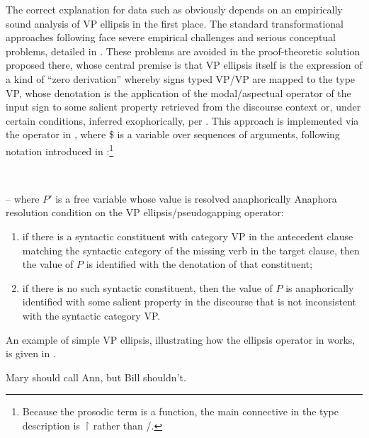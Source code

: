 \documentclass[output=paper,colorlinks,citecolor=brown]{langscibook}
\begin{document}
The correct explanation for data such as  obviously
depends on an empirically sound analysis of VP ellipsis in the first
place. The standard transformational approaches following \citet{kuno1981}
face severe empirical challenges and serious conceptual problems,
detailed in \citet{kubota-levine-pseudo}. These problems are avoided in the
proof-theoretic solution proposed there, whose central premise is that VP
ellipsis itself is the expression of a kind of ``zero derivation''
whereby signs typed VP/VP are mapped to the type VP, whose denotation
is the application of the modal/aspectual operator of the input sign
to some salient property retrieved from the discourse context or,
under certain conditions, inferred exophorically, per
\citet{MillerPullum13}. This approach is implemented via the operator in
, where \$ is a variable over sequences of arguments,
following notation introduced in :\footnote{Because the
prosodic term is a function, the main connective in the type
description is \ensuremath{\vs} rather than /.}

\begin{exe}
 \ex\label{ellipseOp1}
   \\

   -- where $P'$ is a free variable whose value is
  resolved anaphorically
 \ex
  Anaphora resolution condition on the VP ellipsis/pseudogapping
  operator:
  \begin{enumerate}
   \item
    if there is a syntactic  constituent
    with category VP in the antecedent clause matching the
    syntactic  category of the missing verb in the target clause,
    then the value of $P$ is identified with the denotation of that constituent;
   \item
    if there is no such syntactic  constituent, then the value of $P$  is anaphorically
    identified with some salient property in the discourse that is not
    inconsistent with the syntactic  category VP.
  \end{enumerate}
\end{exe}
An example of simple VP ellipsis, illustrating how the ellipsis operator
in  works, is given in .

\begin{exe}
 \ex\label{simpleVPE}    Mary should call Ann, but Bill shouldn't.
\end{exe}
\end{document}
